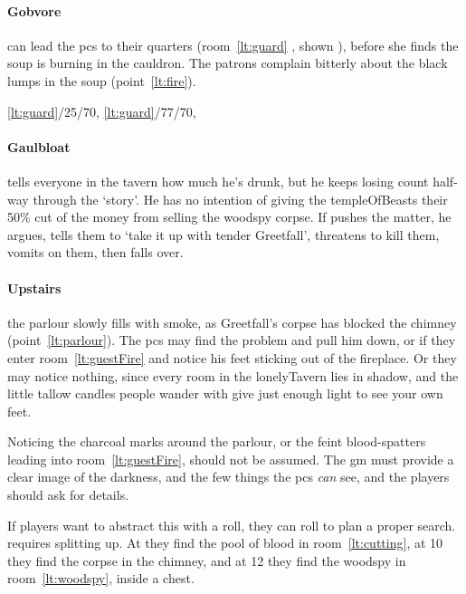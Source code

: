 \documentclass[10pt,twoside]{book}
\begin{document}
\paragraph{Gobvore}
can lead the \glspl{pc} to their quarters (room~\ref{lt:guard} , shown ), before she finds the soup is burning in the cauldron.
The patrons complain bitterly about the black lumps in the soup (point~\vref{lt:fire}).

%
{%
  \ref{lt:guard}/25/70,
  \ref{lt:guard}/77/70,
}%
{}
\paragraph{Gaulbloat}
tells everyone in the tavern how much he's drunk, but he keeps losing count half-way through the `story'.
He has no intention of giving the \gls{templeOfBeasts} their 50\% cut of the money from selling the \gls{woodspy} corpse.
If  pushes the matter, he argues, tells them to `take it up with \Gls{tender} Greetfall', threatens to kill them, vomits on them, then falls over.

\paragraph{Upstairs}
the parlour slowly fills with smoke, as Greetfall's corpse has blocked the chimney (point~\vref{lt:parlour}).
The \glspl{pc} may find the problem and pull him down, or if they enter room~\vref{lt:guestFire} and notice his feet sticking out of the fireplace.
Or they may notice nothing, since every room in the \gls{lonelyTavern} lies in shadow, and the little tallow candles people wander with give just enough light to see your own feet.

Noticing the charcoal marks around the parlour, or the feint blood-spatters leading into room~\vref{lt:guestFire}, should not be assumed.
The \gls{gm} must provide a clear image of the darkness, and the few things the \glspl{pc} \emph{can} see, and the players should ask for details.

If players want to abstract this with a roll, they can roll  to plan a proper search.
 requires splitting up.
At \tn[6] they find the pool of blood in room~\vref{lt:cutting}, at 10 they find the corpse in the chimney,
and at 12 they find the \gls{woodspy} in room~\vref{lt:woodspy}, inside a chest.

\end{document}
